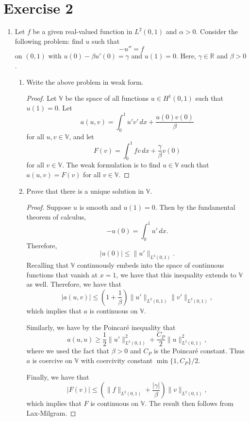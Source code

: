 \documentclass{article}
\begin{document}
\section*{Exercise 2}
\begin{enumerate}
	\item Let $f$ be a given real-valued function in $L^2(0,1)$ and $\alpha > 0$.
	      Consider the following problem: find $u$ such that \[-u'' = f\] on $(0,1)$ with $u(0) - \beta u'(0) = \gamma$ and $u(1) = 0$.
	      Here, $\gamma \in \mathbb R$ and $\beta > 0$.
	      \begin{enumerate}
		      \item Write the above problem in weak form.
		            \begin{proof}
			            Let $\mathbb V$ be the space of all functions $u \in H^1(0,1)$ such that $u(1) = 0$.
			            Let
			            \[a(u,v) = \int_0^1u'v'\,dx + \frac{u(0)v(0)}{\beta}\]
			            for all $u,v\in\mathbb V$, and let
			            \[F(v) = \int_0^1 fv\,dx + \frac{\gamma}{\beta}v(0)\]
			            for all $v \in \mathbb V$.
			            The weak formulation is to find $u \in \mathbb V$ such that $a(u,v) = F(v)$ for all $v \in \mathbb V$.
		            \end{proof}
		      \item Prove that there is a unique solution in $\mathbb V$.
		            \begin{proof}
			            Suppose $u$ is smooth and $u(1) = 0$.
			            Then by the fundamental theorem of calculus, \[-u(0) = \int_0^1u'\,dx.\]
			            Therefore, \[|u(0)| \leq \|u'\|_{L^2(0,1)}.\]
			            Recalling that $\mathbb V$ continuously embeds into the space of continuous functions that vanish at $x = 1$, we have that this inequality extends to $\mathbb V$ as well.
			            Therefore, we have that \[|a(u,v)| \leq (1 + \frac{1}{\beta})\|u'\|_{L^2(0,1)}\|v'\|_{L^2(0,1)},\]
			            which implies that $a$ is continuous on $\mathbb V$.

			            Similarly, we have by the Poincar\'e inequality that \[a(u,u) \geq \frac{1}{2}\|u'\|_{L^2(0,1)}^2 + \frac{C_P}{2}\|u\|_{L^2(0,1)}^2,\]
			            where we used the fact that $\beta > 0$ and $C_P$ is the Poincar\'e constant.
			            Thus $a$ is coercive on $\mathbb V$ with coercivity constant $\min\{1,C_P\}/2$.

			            Finally, we have that \[|F(v)| \leq (\|f\|_{L^2(0,1)} + \frac{|\gamma|}{\beta})\|v\|_{L^2(0,1)},\]
			            which implies that $F$ is continuous on $\mathbb V$.
			            The result then follows from Lax-Milgram.
		            \end{proof}


\end{enumerate}
\end{enumerate}
\end{document}
